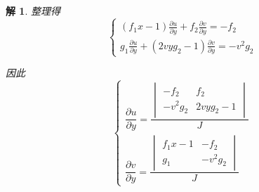 \documentclass[a4paper,12pt]{article}
\newtheorem*{sol}{解}
\begin{document}
\begin{sol}
    整理得
    $$\begin{cases}
            (f_1 x - 1)\frac{\partial u}{\partial y} + f_2\frac{\partial v}{\partial y} = -f_2 \\
            g_1\frac{\partial u}{\partial y} + (2vy g_2 - 1)\frac{\partial v}{\partial y} = -v^2 g_2
        \end{cases}$$

    因此
    $$\begin{cases}
            \dfrac{\partial u}{\partial y} = \dfrac{\begin{vmatrix}
                                                            -f_2     & f_2         \\
                                                            -v^2 g_2 & 2vy g_2 - 1
                                                        \end{vmatrix}}{J} \\[15pt]
            \dfrac{\partial v}{\partial y} = \dfrac{\begin{vmatrix}
                                                            f_1 x - 1 & -f_2     \\
                                                            g_1       & -v^2 g_2
                                                        \end{vmatrix}}{J}
        \end{cases}$$


\end{sol}
\end{document}
